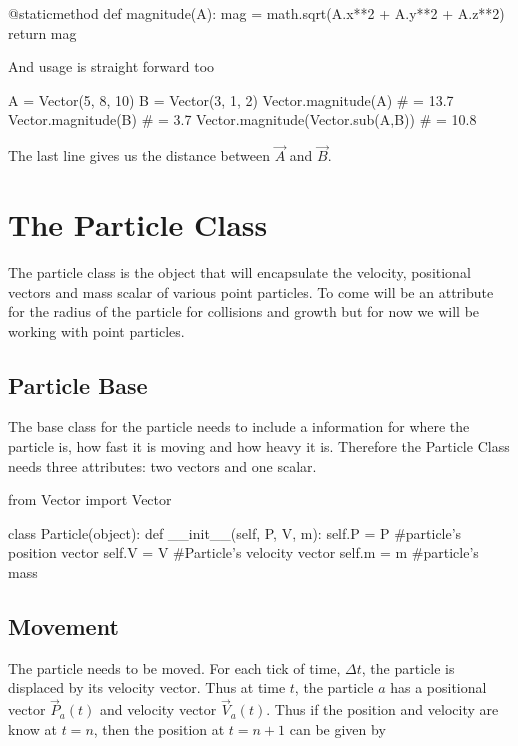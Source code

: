 \documentclass[15pt]{report}
\begin{document}
\begin{code}
@staticmethod
def magnitude(A):
   mag = math.sqrt(A.x**2 + A.y**2 + A.z**2)
   return mag
\end{code}

And usage is straight forward too

\begin{code}
A = Vector(5, 8, 10)
B = Vector(3, 1, 2)
Vector.magnitude(A)                     # = 13.7
Vector.magnitude(B)                     # = 3.7
Vector.magnitude(Vector.sub(A,B))       # = 10.8
\end{code}

The last line gives us the distance between $\vec{A}$ and $\vec{B}$.

\section{The Particle Class}
The particle class is the object that will encapsulate the velocity, positional vectors and mass scalar of various point particles. To come will be an attribute for the radius of the particle for collisions and growth but for now we will be working with point particles.

\subsection{Particle Base} The base class for the particle needs to include a information for where the particle is, how fast it is moving and how heavy it is. Therefore the Particle Class needs three attributes: two vectors and one scalar.

\begin{code}
from Vector import Vector

class Particle(object):
    def __init__(self, P, V, m):
        self.P = P        #particle's position vector
        self.V = V        #Particle's velocity vector
        self.m = m        #particle's mass
\end{code}

\subsection{Movement} The particle needs to be moved. For each tick of time, $\Delta t$, the particle is displaced by its velocity vector. Thus at time $t$, the particle $a$ has a positional vector $\vec{P}_{a}(t)$ and velocity vector $\vec{V}_{a}(t)$. Thus if the position and velocity are know at $t=n$, then the position at $t = n+1$ can be given by
\end{document}
